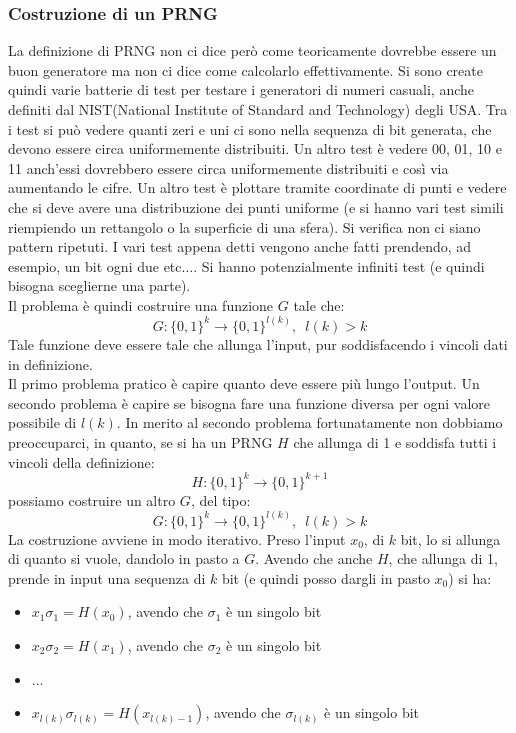\documentclass[a4paper,12pt, oneside]{book}
\begin{document}
\subsubsection{Costruzione di un PRNG}
La definizione di PRNG non ci dice però come teoricamente dovrebbe essere un
buon generatore ma non ci dice come calcolarlo effettivamente. Si sono create
quindi varie batterie di test per testare i generatori di numeri casuali, anche
definiti dal NIST(National Institute of Standard and Technology) degli USA. Tra
i test si può vedere quanti zeri e uni ci sono nella sequenza di bit generata,
che devono essere circa uniformemente distribuiti. Un altro test è vedere 00,
01, 10 e 11 anch'essi dovrebbero essere circa uniformemente distribuiti e così
via aumentando le cifre. Un altro test è plottare tramite coordinate di punti e
vedere che si deve avere una distribuzione dei punti uniforme (e si hanno vari
test simili riempiendo un rettangolo o la superficie di una sfera). Si verifica
non ci siano pattern ripetuti. I vari test appena detti vengono anche fatti
prendendo, ad esempio, un bit ogni due etc$\ldots$. Si hanno potenzialmente
infiniti test (e quindi bisogna sceglierne una parte). \\
Il problema è quindi costruire una funzione $G$ tale che:
\[G:\{0,1\}^k\to\{0,1\}^{l(k)},\,\,\,l(k)>k\]
Tale funzione deve essere tale che allunga l'input, pur soddisfacendo i vincoli
dati in definizione.\\
Il primo problema pratico è capire quanto deve essere più lungo l'output. Un
secondo problema è capire se bisogna fare una funzione diversa per ogni valore
possibile di $l(k)$. In merito al secondo problema fortunatamente non dobbiamo
preoccuparci, in quanto, se si ha un PRNG $H$ che allunga di 1 e soddisfa tutti
i vincoli della definizione:
\[H:\{0,1\}^k\to\{0,1\}^{k+1}\]
possiamo costruire un altro $G$, del tipo:
\[G:\{0,1\}^k\to\{0,1\}^{l(k)},\,\,\,l(k)>k\]
La costruzione avviene in modo iterativo. Preso l'input $x_0$, di $k$ bit, lo si
allunga di quanto si vuole, dandolo in pasto a $G$. Avendo che anche $H$, che
allunga di 1, prende
in input una sequenza di $k$ bit (e quindi posso dargli in pasto $x_0$) si ha:
\begin{itemize}
  \item $x_1\sigma_1=H(x_0)$, avendo che $\sigma_1$ è un singolo bit
  \item $x_2\sigma_2=H(x_1)$, avendo che $\sigma_2$ è un singolo bit
  \item $\ldots$
  \item $x_{l(k)}\sigma_{l(k)}=H(x_{l(k)-1})$, avendo che $\sigma_{l(k)}$ è un
  singolo bit  
\end{itemize}
\end{document}
